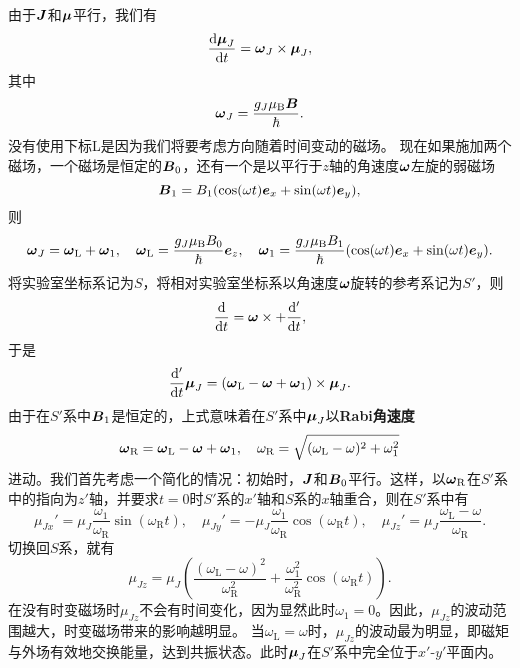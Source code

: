 \documentclass[UTF8, a4paper]{ctexart}
\begin{document}
由于$\vb*{J}$和$\vb*{\mu}$平行，我们有
\[
    \dv{\vb*{\mu}_J}{t} = \vb*{\omega}_J \times \vb*{\mu}_J,
\]
其中
\[
    \vb*{\omega}_J = \frac{g_J \mu_\text{B} \vb*{B}}{\hbar}.
\]
没有使用下标L是因为我们将要考虑方向随着时间变动的磁场。
现在如果施加两个磁场，一个磁场是恒定的$\vb*{B}_0$，还有一个是以平行于$z$轴的角速度$\vb*{\omega}$左旋的弱磁场
\begin{equation}
    \vb*{B}_1 = B_1 (\cos(\omega t) \vb*{e}_x + \sin(\omega t) \vb*{e}_y),
\end{equation}
则
\begin{equation}
    \vb*{\omega}_J = \vb*{\omega}_\text{L} + \vb*{\omega}_{1}, \quad \vb*{\omega}_\text{L} = \frac{g_J \mu_\text{B} B_0}{\hbar} \vb*{e}_z, \quad \vb*{\omega}_1 = \frac{g_J \mu_\text{B} B_1}{\hbar} (\cos(\omega t) \vb*{e}_x + \sin (\omega t) \vb*{e}_y).
\end{equation}
将实验室坐标系记为$S$，将相对实验室坐标系以角速度$\vb*{\omega}$旋转的参考系记为$S'$，则
\[
    \dv{t} = \vb*{\omega} \times + \dv'{t},
\]
于是
\[
    \dv'{t} \vb*{\mu}_J = (\vb*{\omega}_\text{L} - \vb*{\omega} + \vb*{\omega}_1) \times \vb*{\mu}_J.
\]
由于在$S'$系中$\vb*{B}_1$是恒定的，上式意味着在$S'$系中$\vb*{\mu}_J$以\textbf{Rabi角速度}
\begin{equation}
    \vb*{\omega}_\text{R} = \vb*{\omega}_\text{L} - \vb*{\omega} + \vb*{\omega}_1, \quad \omega_\text{R} = \sqrt{(\omega_\text{L} - \omega)^2 + \omega_1^2}
\end{equation}
进动。我们首先考虑一个简化的情况：初始时，$\vb*{J}$和$\vb*{B}_0$平行。这样，以$\vb*{\omega}_\text{R}$在$S'$系中的指向为$z'$轴，并要求$t=0$时$S'$系的$x'$轴和$S$系的$x$轴重合，则在$S'$系中有
\begin{equation}
    \mu_{Jx}' = \mu_J \frac{\omega_1}{\omega_\text{R}} \sin (\omega_\text{R} t), \quad \mu_{Jy}' = - \mu_J \frac{\omega_1}{\omega_\text{R}} \cos (\omega_\text{R} t), \quad \mu_{Jz}' = \mu_J \frac{\omega_\text{L} - \omega}{\omega_\text{R}}.
\end{equation}
切换回$S$系，就有
\begin{equation}
    \mu_{Jz} = \mu_J \left( \frac{(\omega_\text{L} - \omega)^2}{\omega_\text{R}^2} + \frac{\omega_1^2}{\omega_\text{R}^2} \cos (\omega_\text{R} t) \right).
\end{equation}
在没有时变磁场时$\mu_{Jz}$不会有时间变化，因为显然此时$\omega_1=0$。因此，$\mu_{Jz}$的波动范围越大，时变磁场带来的影响越明显。
当$\omega_\text{L}=\omega$时，$\mu_{Jz}$的波动最为明显，即磁矩与外场有效地交换能量，达到共振状态。此时$\vb*{\mu}_J$在$S'$系中完全位于$x'$-$y'$平面内。
\end{document}
